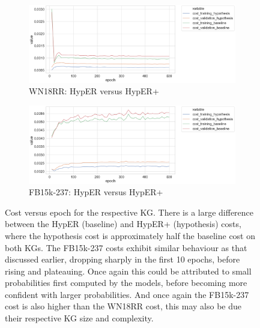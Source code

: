 \begin{figure}[H]
	\begin{subfigure}[b]{.5\linewidth}
   		\centering
    		\includegraphics[width=1.0\linewidth, height=0.6\linewidth]{WN18RR_Cost_Results}
		\captionsetup{justification=centering}
		\caption{WN18RR: HypER versus HypER+}
	\end{subfigure}
	\begin{subfigure}[b]{.5\linewidth}
   		\centering
		\includegraphics[width=1.0\linewidth, height=0.6\linewidth]{FB15k-237_Cost_Results}
		\captionsetup{justification=centering}
		\caption{FB15k-237: HypER versus HypER+}
	\end{subfigure}
	\captionsetup{justification=centering}
	\caption{Cost versus epoch for the respective KG. There is a large difference between the HypER (baseline) and HypER+ (hypothesis) costs, where the hypothesis cost is approximately half the baseline cost on both KGs. The FB15k-237 costs exhibit similar behaviour as that discussed earlier, dropping sharply in the first 10 epochs, before rising and plateauing. Once again this could be attributed to small probabilities first computed by the models, before becoming more confident with larger probabilities. And once again the FB15k-237 cost is also higher than the WN18RR cost, this may also be due their respective KG size and complexity.}
\end{figure}

